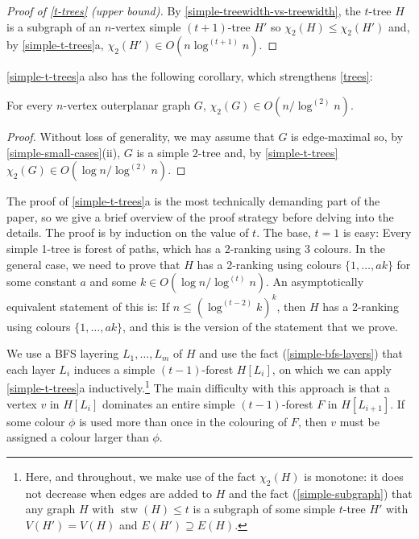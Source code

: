 \documentclass[kpfonts]{patmorin}
\DeclareMathOperator{\stw}{stw}
\newcommand{\trn}{\chi_2}
\theoremstyle{named}
\newcommand{\weirdref}[2]{\cref{#1}#2}
\begin{document}
\begin{proof}[Proof of \cref{t-trees} (upper bound)]
    By \cref{simple-treewidth-vs-treewidth}, the $t$-tree $H$ is a subgraph of an $n$-vertex simple $(t+1)$-tree $H'$ so $\trn(H)\le \trn(H')$ and, by   \weirdref{simple-t-trees}{a}, $\trn(H')\in O(n\log^{(t+1)}n)$.
\end{proof}

\weirdref{simple-t-trees}{a} also has the following corollary, which strengthens \cref{trees}:

\begin{cor}\label{outerplanar}
    For every $n$-vertex outerplanar graph $G$, $\trn(G)\in O(n/\log^{(2)} n)$.
\end{cor}

\begin{proof}
    Without loss of generality, we may assume that $G$ is edge-maximal so, by \cref{simple-small-cases}{(ii)}, $G$ is a simple $2$-tree and, by \cref{simple-t-trees} $\trn(G)\in O(\log n/\log^{(2)} n)$.
\end{proof}


The proof of \weirdref{simple-t-trees}{a} is the most technically demanding part of the paper, so we give a brief overview of the proof strategy before delving into the details.  The proof is by induction on the value of $t$.  The base, $t=1$ is easy: Every simple 1-tree is forest of paths, which has a 2-ranking using 3 colours.  In the general case, we need to prove that $H$ has a 2-ranking using colours $\{1,\ldots,ak\}$ for some constant $a$ and some $k\in O(\log n/\log^{(t)} n)$.  An asymptotically equivalent statement of this is: If $n \le (\log^{(t-2)}k)^k$, then $H$ has a 2-ranking using colours $\{1,\ldots,ak\}$, and this is the version of the statement that we prove.

We use a BFS layering $L_1,\ldots,L_m$ of $H$ and use the fact (\cref{simple-bfs-layers}) that each layer $L_i$ induces a simple $(t-1)$-forest $H[L_i]$, on which we can apply \weirdref{simple-t-trees}{a} inductively.\footnote{Here, and throughout, we make use of the fact $\trn(H)$ is monotone: it does not decrease when edges are added to $H$ and the fact (\cref{simple-subgraph}) that any graph $H$ with $\stw(H)\le t$ is a subgraph of some simple $t$-tree $H'$ with $V(H')=V(H)$ and $E(H')\supseteq E(H)$.}  The main difficulty with this approach is that a vertex $v$ in $H[L_i]$ dominates an entire simple $(t-1)$-forest $F$ in $H[L_{i+1}]$.  If some colour $\phi$ is used more than once in the colouring of $F$, then $v$ must be assigned a colour larger than $\phi$.
\end{document}
